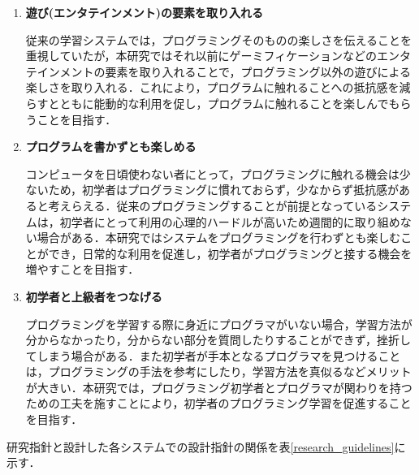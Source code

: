 \begin{enumerate}
  \item {\bf 遊び(エンタテインメント)の要素を取り入れる}
  
  従来の学習システムでは，プログラミングそのものの楽しさを伝えることを重視していたが，本研究ではそれ以前にゲーミフィケーションなどのエンタテインメントの要素を取り入れることで，プログラミング以外の遊びによる楽しさを取り入れる．これにより，プログラムに触れることへの抵抗感を減らすとともに能動的な利用を促し，プログラムに触れることを楽しんでもらうことを目指す．


  \item {\bf プログラムを書かずとも楽しめる}


  コンピュータを日頃使わない者にとって，プログラミングに触れる機会は少ないため，初学者はプログラミングに慣れておらず，少なからず抵抗感があると考えらえる．従来のプログラミングすることが前提となっているシステムは，初学者にとって利用の心理的ハードルが高いため週間的に取り組めない場合がある．本研究ではシステムをプログラミングを行わずとも楽しむことができ，日常的な利用を促進し，初学者がプログラミングと接する機会を増やすことを目指す．

  \item {\bf 初学者と上級者をつなげる}


  プログラミングを学習する際に身近にプログラマがいない場合，学習方法が分からなかったり，分からない部分を質問したりすることができず，挫折してしまう場合がある．また初学者が手本となるプログラマを見つけることは，プログラミングの手法を参考にしたり，学習方法を真似るなどメリットが大きい．本研究では，プログラミング初学者とプログラマが関わりを持つための工夫を施すことにより，初学者のプログラミング学習を促進することを目指す．

\end{enumerate}

研究指針と設計した各システムでの設計指針の関係を表\ref{research_guidelines}に示す．

